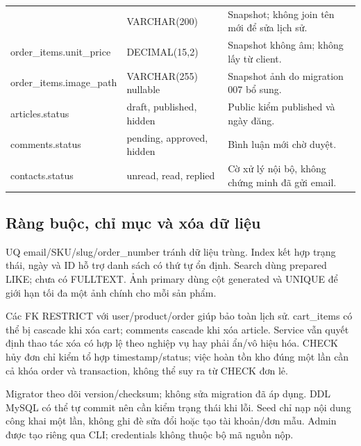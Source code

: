 \begin{longtable}{@{}P{4.4cm}P{3.2cm}P{6.9cm}@{}}
 & VARCHAR(200) & Snapshot; không join tên mới để sửa lịch sử.\\
order\_items.unit\_price & DECIMAL(15,2) & Snapshot không âm; không lấy từ client.\\
order\_items.image\_path & VARCHAR(255) nullable & Snapshot ảnh do migration 007 bổ sung.\\
articles.status & draft, published, hidden & Public kiểm published và ngày đăng.\\
comments.status & pending, approved, hidden & Bình luận mới chờ duyệt.\\
contacts.status & unread, read, replied & Cờ xử lý nội bộ, không chứng minh đã gửi email.\\
\bottomrule\end{longtable}

\subsection{Ràng buộc, chỉ mục và xóa dữ liệu}
UQ email/SKU/slug/order\_number tránh dữ liệu trùng. Index kết hợp trạng thái, ngày và ID hỗ trợ danh sách có thứ tự ổn định. Search dùng prepared LIKE; chưa có FULLTEXT. Ảnh primary dùng cột generated và UNIQUE để giới hạn tối đa một ảnh chính cho mỗi sản phẩm.

Các FK RESTRICT với user/product/order giúp bảo toàn lịch sử. cart\_items có thể bị cascade khi xóa cart; comments cascade khi xóa article. Service vẫn quyết định thao tác xóa có hợp lệ theo nghiệp vụ hay phải ẩn/vô hiệu hóa. CHECK hủy đơn chỉ kiểm tổ hợp timestamp/status; việc hoàn tồn kho đúng một lần cần cả khóa order và transaction, không thể suy ra từ CHECK đơn lẻ.

Migrator theo dõi version/checksum; không sửa migration đã áp dụng. DDL MySQL có thể tự commit nên cần kiểm trạng thái khi lỗi. Seed chỉ nạp nội dung công khai một lần, không ghi đè sửa đổi hoặc tạo tài khoản/đơn mẫu. Admin được tạo riêng qua CLI; credentials không thuộc bộ mã nguồn nộp.
\clearpage

